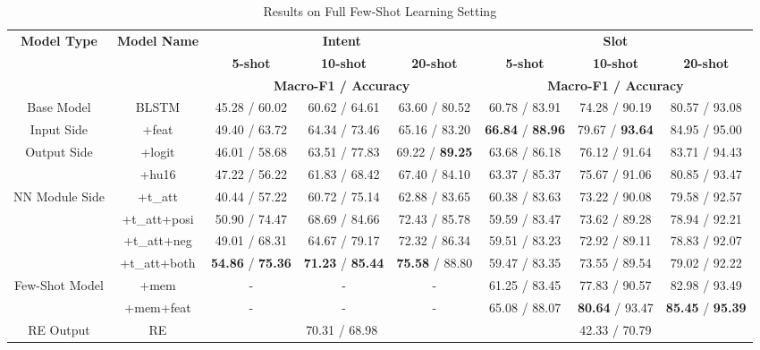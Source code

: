 \begin{table*}
{\begin{tabular}{|c|c|c|c|c|c|c|c|}
\hline
\multirow{3}{*}{\textbf{Model Type}} & \multirow{3}{*}{\textbf{Model Name}}  & \multicolumn{3}{|c|}{\textbf{Intent}} & \multicolumn{3}{|c|}{\textbf{Slot}} \\
\cline{3-8}
&  & \multicolumn{1}{|c|}{\textbf{5-shot}} & \multicolumn{1}{|c|}{\textbf{10-shot}} & \multicolumn{1}{|c|}{\textbf{20-shot}}
& \multicolumn{1}{|c|}{\textbf{5-shot}} & \multicolumn{1}{|c|}{\textbf{10-shot}} & \multicolumn{1}{|c|}{\textbf{20-shot}}  \\
\cline{3-8}
&  & \multicolumn{3}{|c|}{\textbf{Macro-F1 / Accuracy}} & \multicolumn{3}{|c|}{\textbf{Macro-F1 / Accuracy}} \\
\hline
Base Model & BLSTM & 45.28 / 60.02 & 60.62 / 64.61 & 63.60 / 80.52
& 60.78 / 83.91 & 74.28  / 90.19 & 80.57 / 93.08  \\
\hline
Input Side & +feat & 49.40 / 63.72 & 64.34 / 73.46 & 65.16 / 83.20
& \textbf{66.84} / \textbf{88.96} & 79.67 / \textbf{93.64} & 84.95 / 95.00  \\
\hline
\multirow{2}{*}{Output Side} & +logit & 46.01 / 58.68 & 63.51 / 77.83 & 69.22 / \textbf{89.25}
& 63.68 / 86.18 & 76.12 / 91.64  & 83.71 / 94.43 \\
\cline{2-8}
& +hu16 & 47.22 / 56.22 & 61.83 / 68.42 & 67.40 / 84.10
& 63.37 / 85.37 & 75.67 / 91.06 & 80.85 / 93.47  \\
\hline
\multirow{2}{*}{\vspace{-2.2em}NN Module Side} & +t\_att & 40.44 / 57.22 & 60.72 / 75.14 & 62.88 / 83.65
& 60.38 / 83.63 & 73.22 / 90.08 & 79.58 / 92.57  \\
\cline{2-8}
& +t\_att+posi & 50.90 / 74.47 & 68.69 / 84.66 & 72.43 / 85.78
& 59.59 / 83.47 & 73.62 / 89.28 & 78.94 / 92.21 \\
\cline{2-8}
& +t\_att+neg & 49.01 / 68.31 & 64.67 / 79.17 & 72.32 / 86.34
& 59.51 / 83.23 & 72.92 / 89.11 & 78.83 / 92.07 \\
\cline{2-8}
& +t\_att+both & \textbf{54.86} / \textbf{75.36} & \textbf{71.23} / \textbf{85.44} & \textbf{75.58} / 88.80
& 59.47 / 83.35 & 73.55 / 89.54 & 79.02 / 92.22 \\
\hline
\multirow{2}{*}{Few-Shot Model} & +mem & - & - & - & 61.25 / 83.45 & 77.83 / 90.57 & 82.98 / 93.49 \\
\cline{2-8}
& +mem+feat & - & - & - & 65.08 / 88.07 & \textbf{80.64} / 93.47 & \textbf{85.45} / \textbf{95.39} \\
\hline
\hline
RE Output & RE & \multicolumn{3}{|c|}{70.31 / 68.98} & \multicolumn{3}{|c|}{42.33 / 70.79} \\
\hline
\end{tabular}
}
\caption{Results on Full Few-Shot Learning Setting}
\label{tab_full_few}
\end{table*}

